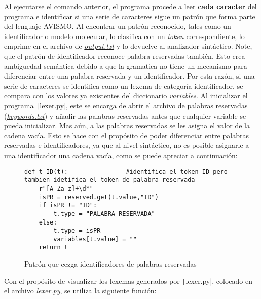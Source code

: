 Al ejecutarse el comando anterior, el programa procede a leer \textbf{cada caracter} del programa e identificar si una serie de caracteres sigue un patrón que forma parte del lenguaje AVISMO. Al encontrar un patrón reconocido, tales como un identificador o modelo molecular, lo clasifica con un \textit{token} correspondiente, lo emprime en el archivo de \href{https://github.com/aramis-matos/comp4999_compilers_project/blob/master/code/python_remake/output.txt}{\textit{output.txt}} y lo devuelve al analizador sintáctico. Note, que el patrón de identificador reconoce palabra reservadas también. Esto crea ambiguedad semántica debido a que la gramatica no tiene un mecanismo para diferenciar entre una palabra reservada y un identificador. Por esta razón, si una serie de caracteres se identifica como un lexema de categoría identificador, se compara con los valores ya existentes del diccionario \textit{variables}. Al inicializar el programa \texttt|lexer.py|, este se encarga de abrir el archivo de
palabras reservadas (\href{https://github.com/aramis-matos/comp4999_compilers_project/blob/master/code/python remake/keywords.txt}{\textit{keywords.txt}}) y añadir las palabras reservadas antes que cualquier variable se pueda inicializar. Mas aún, a las palabras reservadas se les asigna el valor de la cadena vacía. Esto se hace con el propósito de poder diferenciar entre palabras reservadas e identificadores, ya que al nivel sintáctico, no es posible asignarle a una identificador una cadena vacía, como se puede apreciar a continuación:
\begin{figure}[H]
\begin{verbatim}
def t_ID(t):                #identifica el token ID pero tambien idetifica el token de palabra reservada
    r"[A-Za-z]+\d*"
    isPR = reserved.get(t.value,"ID") 
    if isPR != "ID":
        t.type = "PALABRA_RESERVADA"
    else:
        t.type = isPR
        variables[t.value] = ""
    return t
\end{verbatim}
\caption{Patrón que cezga identificadores de palabras reservadas}
\label{fig: id}
\end{figure}
Con el propósito de visualizar los lexemas generados por \texttt|lexer.py|, colocado en el archivo \href{https://github.com/aramis-matos/comp4999_compilers_project/blob/master/code/python_remake/lexer.py}{\textit{lexer.py}}, se utiliza la siguiente función:
